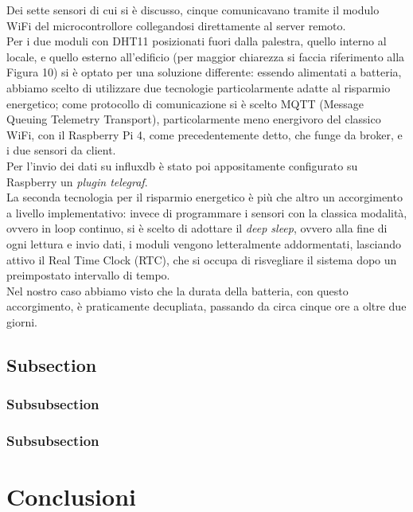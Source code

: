 \documentclass[fleqn,10pt]{SelfArx} %
\begin{document}
Dei sette sensori di cui si è discusso, cinque comunicavano tramite il modulo WiFi del microcontrollore collegandosi 
direttamente al server remoto.\\
Per i due moduli con DHT11 posizionati fuori dalla palestra, quello interno al locale, e quello esterno all'edificio 
(per maggior chiarezza si faccia riferimento alla Figura 10) si è optato per una soluzione differente: essendo 
alimentati a batteria, abbiamo scelto di utilizzare due tecnologie particolarmente adatte al risparmio energetico; 
come protocollo di comunicazione si è scelto MQTT (Message Queuing Telemetry Transport), particolarmente meno 
energivoro del classico WiFi, con il Raspberry Pi 4, come precedentemente detto, che funge da broker, e i due sensori 
da client. \\
Per l'invio dei dati su influxdb è stato poi appositamente configurato su Raspberry un \textit{plugin telegraf}.\\
La seconda tecnologia per il risparmio energetico è più che altro un accorgimento a livello implementativo: invece di 
programmare i sensori con la classica modalità, ovvero in loop continuo, si è scelto di adottare il \textit{deep sleep}, 
ovvero alla fine di ogni lettura e invio dati, i moduli vengono letteralmente addormentati, lasciando attivo il Real 
Time Clock (RTC), che si occupa di risvegliare il sistema dopo un preimpostato intervallo di tempo.\\
Nel nostro caso abbiamo visto che la durata della batteria, con questo accorgimento, è praticamente decupliata, 
passando da circa cinque ore a oltre due giorni.

\subsection{Subsection}


\subsubsection{Subsubsection}

\subsubsection{Subsubsection}

\section{Conclusioni}





\end{document}
